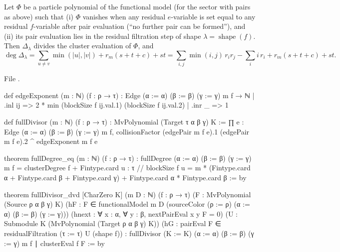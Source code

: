 \begin{theorem}\label{l20:thm:gordon}
Let $\Phi$ be a particle polynomial of the functional model (for the sector with pairs as above) such that
(i) $\Phi$ vanishes when any residual $e$-variable is set equal to any residual $f$-variable after pair
evaluation (``no further pair can be formed''), and (ii) its pair evaluation lies in the residual filtration step
of shape $\lambda=\operatorname{shape}(f)$. Then $\Delta_\lambda$ divides the cluster evaluation of $\Phi$, and
\begin{equation*}
\deg\Delta_\lambda=\sum_{u\neq v}\min(|u|,|v|)+r_m(s+t+c)+st
=\sum_{i,j}\min(i,j)\,r_ir_j-\sum_i i\,r_i+r_m(s+t+c)+st .
\end{equation*}
\end{theorem}
\noindent File .
\begin{leancode}
def edgeExponent (m : ℕ) (f : ρ → τ) : Edge (α := α) (β := β) (γ := γ) m f → ℕ
  | .inl ij => 2 * min (blockSize f ij.val.1) (blockSize f ij.val.2)
  | .inr _ => 1

def fullDivisor (m : ℕ) (f : ρ → τ) : MvPolynomial (Target τ α β γ) K :=
  ∏ e : Edge (α := α) (β := β) (γ := γ) m f,
    collisionFactor (edgePair m f e).1 (edgePair m f e).2 ^ edgeExponent m f e

theorem fullDegree_eq (m : ℕ) (f : ρ → τ) :
    fullDegree (α := α) (β := β) (γ := γ) m f = clusterDegree f +
      Fintype.card {u : τ // blockSize f u = m} *
        (Fintype.card α + Fintype.card β + Fintype.card γ) +
      Fintype.card α * Fintype.card β := by

theorem fullDivisor_dvd [CharZero K] (m D : ℕ) (f : ρ → τ)
    (F : MvPolynomial (Source ρ α β γ) K)
    (hF : F ∈ functionalModel m D (sourceColor (ρ := ρ) (α := α) (β := β) (γ := γ)))
    (hnext : ∀ x : α, ∀ y : β, nextPairEval x y F = 0)
    (U : Submodule K (MvPolynomial (Target ρ α β γ) K))
    (hG : pairEval F ∈ residualFiltration (τ := τ) U (shape f)) :
    fullDivisor (K := K) (α := α) (β := β) (γ := γ) m f ∣ clusterEval f F := by
\end{leancode}

